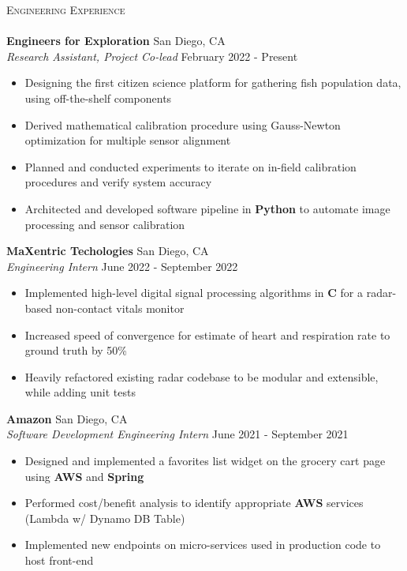 \documentclass[a4paper]{article}
\newcommand{\lineunder} {
    \vspace*{-8pt} \\
    \hspace*{-18pt} \hrulefill \\
}
\newcommand{\header} [1] {
    {\hspace*{-18pt}\vspace*{6pt} \textsc{#1}}
    \vspace*{-6pt} \lineunder
}
\newenvironment{entry}[4][]{
  \textbf{#2} \hfill #1 \\
  \textit{#3} \hfill #4 \\
  \vspace{-2mm}
  \begin{itemize} \itemsep 0em
  }
  {
  \end{itemize}
}
\begin{document}
\header{Engineering Experience}
\vspace{1mm}
\begin{entry}[San Diego, CA]{Engineers for Exploration}{Research
    Assistant, Project Co-lead}{February 2022 - Present}
	\item Designing the first citizen science platform for gathering fish population data,
    using off-the-shelf components
  \item Derived mathematical calibration procedure using Gauss-Newton optimization
    for multiple sensor alignment
  \item Planned and conducted experiments to iterate on in-field calibration procedures and verify system accuracy
	\item Architected and developed software pipeline in \textbf{Python} to automate image
    processing and sensor calibration
\end{entry}
\begin{entry}[San Diego, CA]{MaXentric Techologies}{Engineering Intern}{June
    2022 - September 2022}
	\item Implemented high-level digital signal processing algorithms in \textbf{C} for a radar-based non-contact vitals monitor
  \item Increased speed of convergence for estimate of heart and respiration
    rate to ground truth by 50\%
	\item Heavily refactored existing radar codebase to be modular and
    extensible, while adding unit tests
\end{entry}

  \begin{entry}[San Diego, CA]{Amazon}{Software Development Engineering
      Intern}{June 2021 - September 2021}
  \item Designed and implemented a favorites list widget on the grocery cart page using \textbf{AWS} and \textbf{Spring}
	\item Performed cost/benefit analysis to identify appropriate \textbf{AWS} services (Lambda w/ Dynamo DB Table)
	\item Implemented new endpoints on micro-services used in production code to host front-end
\end{entry}

\begin{comment}
\begin{entry}[San Diego, CA]{HP}{Software Engineering Intern}{June 2020 -
    September 2020}
\item Built an internal 3D measurement tool for biometrics using CGAL, VTK and Qt (\textbf{C++}).
\item Implemented multi-threaded geodesic path searching, and employed
  Levenberg-Marquardt for model alignment
\item Digitized the measurement pipeline for custom 3D insoles, reducing time from several hours to several minutes
\end{entry}
\end{comment}
\end{document}
